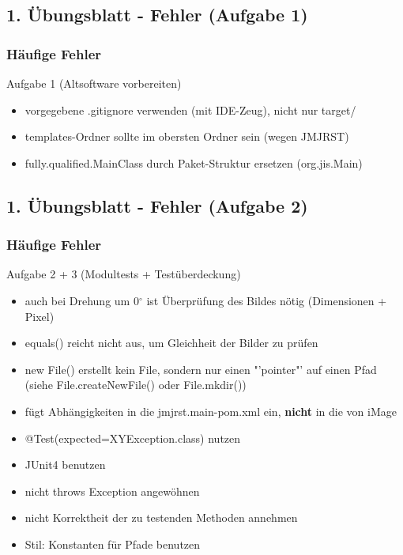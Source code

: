 \documentclass[18pt]{beamer}
\begin{document}
	\subsection{1. Übungsblatt - Fehler (Aufgabe 1)}
	\begin{frame}
		\frametitle{Häufige Fehler}
		\begin{block}{Aufgabe 1 (Altsoftware vorbereiten)}
		\begin{itemize}
			\item vorgegebene .gitignore verwenden (mit IDE-Zeug), nicht nur target/ \pause
			\item templates-Ordner sollte im obersten Ordner sein (wegen JMJRST) \pause
			\item fully.qualified.MainClass durch Paket-Struktur ersetzen (org.jis.Main)
		\end{itemize}
		\end{block}
	\end{frame}
	
	\subsection{1. Übungsblatt - Fehler (Aufgabe 2)}
	\begin{frame}
		\frametitle{Häufige Fehler}
		\begin{block}{Aufgabe 2 + 3 (Modultests + Testüberdeckung)}
			\begin{itemize}
				\item auch bei Drehung um 0$^{\circ}$  ist Überprüfung des Bildes nötig (Dimensionen + Pixel) \pause
				\item equals() reicht nicht aus, um Gleichheit der Bilder zu prüfen \pause 
				\item new File() erstellt kein File, sondern nur einen "'pointer"' auf einen Pfad (siehe File.createNewFile() oder File.mkdir()) \pause
				\item fügt Abhängigkeiten in die jmjrst.main-pom.xml ein, \textbf{nicht} in die von iMage \pause
				\item @Test(expected=XYException.class) nutzen \pause
				\item JUnit4 benutzen \pause
				\item nicht throws Exception angewöhnen \pause
				\item nicht Korrektheit der zu testenden Methoden annehmen \pause
				\item Stil: Konstanten für Pfade benutzen
			\end{itemize}
		\end{block}
	\end{frame}
\end{document}

